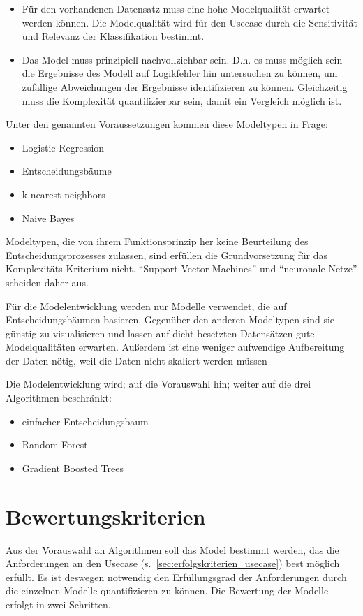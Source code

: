 \begin{itemize}
    \item Für den vorhandenen Datensatz muss eine hohe Modelqualität erwartet werden können. Die Modelqualität wird für den Usecase durch die Sensitivität und Relevanz der Klassifikation bestimmt.
    \item Das Model muss prinzipiell nachvollziehbar sein. D.h. es muss möglich sein die Ergebnisse des Modell auf Logikfehler hin untersuchen zu können, um zufällige Abweichungen der Ergebnisse identifizieren zu können. Gleichzeitig muss die Komplexität quantifizierbar sein, damit ein Vergleich möglich ist.
\end{itemize}

Unter den genannten Voraussetzungen kommen diese Modeltypen in Frage:
\begin{itemize}
    \item Logistic Regression
    \item Entscheidungsbäume
    \item k-nearest neighbors
    \item Naive Bayes
\end{itemize}

Modeltypen, die von ihrem Funktionsprinzip her keine Beurteilung des Entscheidungsprozesses zulassen, sind erfüllen die Grundvorsetzung für das Komplexitäts-Kriterium nicht. \enquote{Support Vector Machines} und \enquote{neuronale Netze} scheiden daher aus.

Für die Modelentwicklung werden nur Modelle verwendet, die auf Entscheidungsbäumen basieren. Gegenüber den anderen Modeltypen sind sie günstig zu visualisieren und lassen auf dicht besetzten Datensätzen gute Modelqualitäten erwarten. Außerdem ist eine weniger aufwendige Aufbereitung der Daten nötig, weil die Daten nicht skaliert werden müssen~\cite[S.~84--85]{Muller.2017}

Die Modelentwicklung wird; auf die Vorauswahl hin; weiter auf die drei Algorithmen beschränkt:
\begin{itemize}
    \item einfacher Entscheidungsbaum
    \item Random Forest
    \item Gradient Boosted Trees
\end{itemize}
\section{Bewertungskriterien}
\label{sec:bewertungskriterien}
Aus der Vorauswahl an Algorithmen soll das Model bestimmt werden, das die Anforderungen an den Usecase (s.~\cref{sec:erfolgskriterien_usecase}) best möglich erfüllt. Es ist deswegen notwendig den Erfüllungsgrad der Anforderungen durch die einzelnen Modelle quantifizieren zu können. Die Bewertung der Modelle erfolgt in zwei Schritten.


